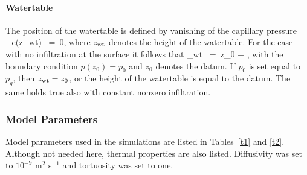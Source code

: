 \documentclass[12pt]{article}
\def\EQ#1\EN{\begin{equation}#1\end{equation}}
\def\BA#1\EA{\begin{align}#1\end{align}}
\newcommand{\eq}{\ =\ }
\newcommand{\F}{{\mathcal F}}
\newcommand{\G}{{\mathcal G}}
\begin{document}
\paragraph{Watertable}

The position of the watertable is defined by vanishing of the capillary pressure
\EQ
P_c(z_{\rm wt}) \eq 0,
\EN
where $z_{\rm wt}$ denotes the height of the watertable. For the case with no infiltration at the surface it follows that
\EQ
z_{\rm wt} \eq z_0 + ,
\EN
with the boundary condition $p(z_0) = p_0$ and $z_0$ denotes the datum. If $p_0$ is set equal to $p_g$, then $z_{\rm wt} = z_0$, or the height of the watertable is equal to the datum.
The same holds true also with constant nonzero infiltration. 

\subsubsection{Model Parameters}

Model parameters used in the simulations are listed in Tables~\ref{t1} and \ref{t2}. Although not needed here, thermal properties are also listed. Diffusivity was set to $10^{-9}$ m$^2$ s$^{-1}$ and tortuosity was set to one.

\renewcommand{\tabcolsep}{1.7mm}
\end{document}
